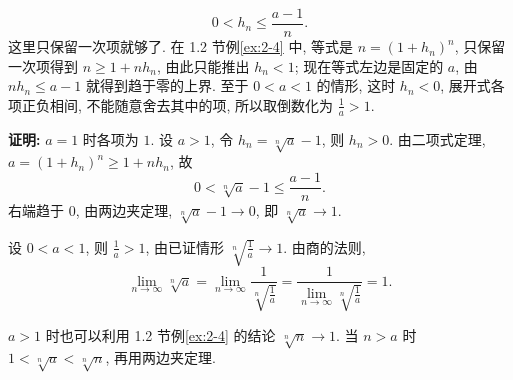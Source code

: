 \documentclass[UTF8,openany]{ctexbook}
\theoremstyle{chinesetextbook}
\newenvironment{cnproof}{\par\indent\textbf{证明:} \ignorespaces}{\par}
\begin{document}
\[
0<h_n\le\frac{a-1}n.
\]
这里只保留一次项就够了. 在 1.2 节例\ref{ex:2-4} 中, 等式是 $n=(1+h_n)^n$, 只保留一次项得到 $n\ge1+nh_n$, 由此只能推出 $h_n<1$; 现在等式左边是固定的 $a$, 由 $nh_n\le a-1$ 就得到趋于零的上界. 至于 $0<a<1$ 的情形, 这时 $h_n<0$, 展开式各项正负相间, 不能随意舍去其中的项, 所以取倒数化为 $\displaystyle\frac1a>1$.
\begin{cnproof}
$a=1$ 时各项为 $1$. 设 $a>1$, 令 $h_n=\sqrt[n]a-1$, 则 $h_n>0$. 由二项式定理, $a=(1+h_n)^n\ge1+nh_n$, 故
\[
0<\sqrt[n]a-1\le\frac{a-1}n.
\]
右端趋于 $0$, 由两边夹定理, $\sqrt[n]a-1\to0$, 即 $\sqrt[n]a\to1$.

设 $0<a<1$, 则 $\displaystyle\frac1a>1$, 由已证情形 $\displaystyle\sqrt[n]{\frac1a}\to1$. 由商的法则,
\[
\lim_{n\to\infty}\sqrt[n]a=\lim_{n\to\infty}\frac1{\sqrt[n]{\frac1a}}=\frac1{\displaystyle\lim_{n\to\infty}\sqrt[n]{\frac1a}}=1.
\]
\end{cnproof}
$a>1$ 时也可以利用 1.2 节例\ref{ex:2-4} 的结论 $\sqrt[n]n\to1$. 当 $n>a$ 时 $1<\sqrt[n]a<\sqrt[n]n$, 再用两边夹定理.
\end{document}
